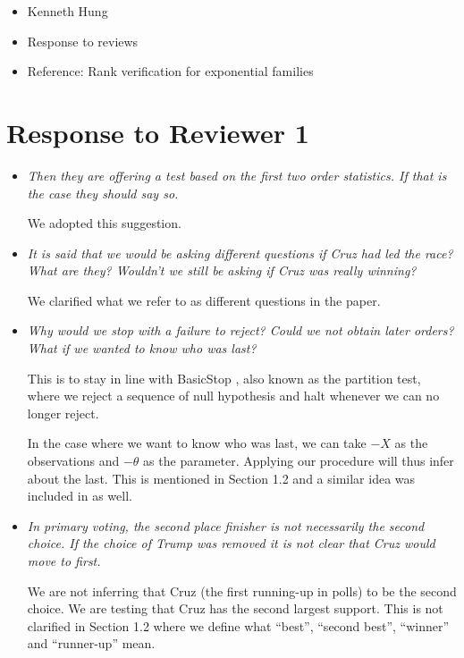 \documentclass[]{article}
\theoremstyle{remark}
\begin{document}
\begin{itemize}

\item Kenneth Hung
\item Response to reviews
\item Reference: Rank verification for exponential families

\end{itemize}

\section{Response to Reviewer 1}

\begin{itemize}

\item {\em Then they are offering a test based on the first two order statistics. If that is the case they should say so.}

We adopted this suggestion.

\item {\em It is said that we would be asking different questions if Cruz had led the race? What are they? Wouldn't we still be asking if Cruz was really winning?}

We clarified what we refer to as different questions in the paper.

\item {\em Why would we stop with a failure to reject? Could we not obtain later orders? What if we wanted to know who was last?}

This is to stay in line with BasicStop \citep{Fithian:2015uj}, also known as the partition test, where we reject a sequence of null hypothesis and halt whenever we can no longer reject.

In the case where we want to know who was last, we can take $-X$ as the observations and $-\theta$ as the parameter. Applying our procedure will thus infer about the last. This is mentioned in Section 1.2 and a similar idea was included in \citet{Stefansson:1988wj} as well.

\item {\em In primary voting, the second place finisher is not necessarily the second choice. If the choice of Trump was removed it is not clear that Cruz would move to first.}

We are not inferring that Cruz (the first running-up in polls) to be the second choice. We are testing that Cruz has the second largest support. This is not clarified in Section 1.2 where we define what ``best'', ``second best'', ``winner'' and ``runner-up'' mean.


\end{itemize}
\end{document}
